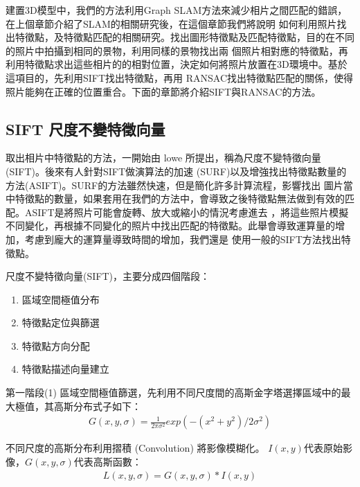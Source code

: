 	建置3D模型中，我們的方法利用Graph SLAM方法來減少相片之間匹配的錯誤，在上個章節介紹了SLAM的相關研究後，在這個章節我們將說明
如何利用照片找出特徵點，及特徵點匹配的相關研究。找出圖形特徵點及匹配特徵點，目的在不同的照片中拍攝到相同的景物，利用同樣的景物找出兩
個照片相對應的特徵點，再利用特徵點求出這些相片的的相對位置，決定如何將照片放置在3D環境中。基於這項目的，先利用SIFT找出特徵點，再用
RANSAC找出特徵點匹配的關係，使得照片能夠在正確的位置重合。下面的章節將介紹SIFT與RANSAC的方法。
	
\subsection{SIFT 尺度不變特徵向量}
	取出相片中特徵點的方法，一開始由 lowe \cite{Lowe2004} 所提出，稱為尺度不變特徵向量(SIFT)。後來有人針對SIFT做演算法的加速
(SURF)\cite{Bay2006}以及增強找出特徵點數量的方法(ASIFT)\cite{Guo2009}。SURF的方法雖然快速，但是簡化許多計算流程，影響找出
圖片當中特徵點的數量，如果套用在我們的方法中，會導致之後特徵點無法做到有效的匹配。ASIFT是將照片可能會旋轉、放大或縮小的情況考慮進去
，將這些照片模擬不同變化，再根據不同變化的照片中找出匹配的特徵點。此舉會導致運算量的增加，考慮到龐大的運算量導致時間的增加，我們還是
使用一般的SIFT方法找出特徵點。

	尺度不變特徵向量(SIFT)，主要分成四個階段：

 \begin{enumerate}
	  \item 區域空間極值分布	
	  \item 特徵點定位與篩選
	  \item 特徵點方向分配
	  \item 特徵點描述向量建立
 \end{enumerate}

   第一階段(1) 區域空間極值篩選，先利用不同尺度間的高斯金字塔選擇區域中的最大極值，其高斯分布式子如下：
\begin{align}
  G(x,y,\sigma) = \frac{1}{2\pi\sigma^2}exp(-(x^2+y^2)/2\sigma^2) 
\end{align}

	不同尺度的高斯分布利用摺積 (Convolution) 將影像模糊化。 $I(x,y)$代表原始影像，$G(x,y,\sigma)$代表高斯函數：	
\begin{align}
  L(x,y,\sigma) = G(x,y,\sigma)\ast{I(x,y)}
\end{align}

